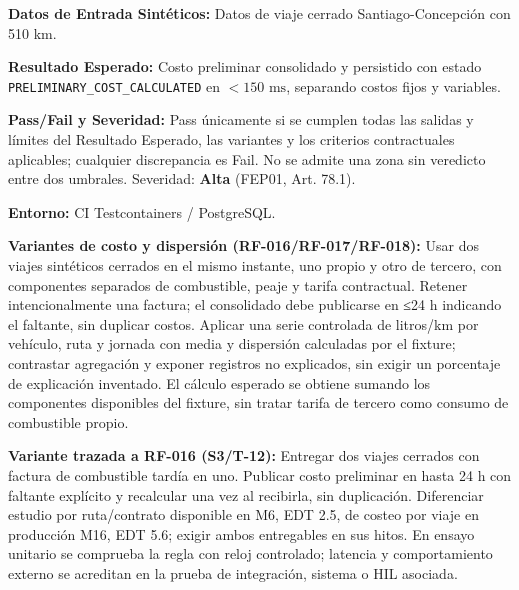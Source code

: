 \par\noindent\textbf{Datos de Entrada Sintéticos:} Datos de viaje cerrado Santiago-Concepción con 510 km.\par
\par\noindent\textbf{Resultado Esperado:} Costo preliminar consolidado y persistido con estado \texttt{P\allowbreak{}R\allowbreak{}E\allowbreak{}L\allowbreak{}I\allowbreak{}M\allowbreak{}I\allowbreak{}N\allowbreak{}A\allowbreak{}R\allowbreak{}Y\allowbreak{}\_\allowbreak{}C\allowbreak{}O\allowbreak{}S\allowbreak{}T\allowbreak{}\_\allowbreak{}C\allowbreak{}A\allowbreak{}L\allowbreak{}C\allowbreak{}U\allowbreak{}L\allowbreak{}A\allowbreak{}T\allowbreak{}E\allowbreak{}D\allowbreak{}} en \(< 150\text{ ms}\), separando costos fijos y variables.\par
\par\noindent\textbf{Pass/Fail y Severidad:} Pass únicamente si se cumplen todas las salidas y límites del Resultado Esperado, las variantes y los criterios contractuales aplicables; cualquier discrepancia es Fail. No se admite una zona sin veredicto entre dos umbrales. Severidad: \textbf{Alta} (FEP01, Art. 78.1).\par
\par\noindent\textbf{Entorno:} CI Testcontainers / PostgreSQL.\par




\par\noindent\textbf{Variantes de costo y dispersión (RF-016/RF-017/RF-018):} Usar dos viajes sintéticos cerrados en el mismo instante, uno propio y otro de tercero, con componentes separados de combustible, peaje y tarifa contractual. Retener intencionalmente una factura; el consolidado debe publicarse en ≤24 h indicando el faltante, sin duplicar costos. Aplicar una serie controlada de litros/km por vehículo, ruta y jornada con media y dispersión calculadas por el fixture; contrastar agregación y exponer registros no explicados, sin exigir un porcentaje de explicación inventado. El cálculo esperado se obtiene sumando los componentes disponibles del fixture, sin tratar tarifa de tercero como consumo de combustible propio.\par\par





\par\noindent\textbf{Variante trazada a RF-016 (S3/T-12):} Entregar dos viajes cerrados con factura de combustible tardía en uno. Publicar costo preliminar en hasta 24 h con faltante explícito y recalcular una vez al recibirla, sin duplicación. Diferenciar estudio por ruta/contrato disponible en M6, EDT 2.5, de costeo por viaje en producción M16, EDT 5.6; exigir ambos entregables en sus hitos. En ensayo unitario se comprueba la regla con reloj controlado; latencia y comportamiento externo se acreditan en la prueba de integración, sistema o HIL asociada.\par

